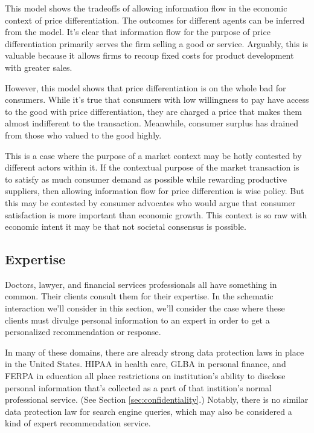 \documentclass[../thesis.tex]{subfiles}
\begin{document}
This model shows the tradeoffs of allowing information
flow in the economic context of price differentiation.
The outcomes for different agents can be inferred from
the model.
It's clear that information flow for the purpose of
price differentiation primarily serves the firm
selling a good or service.
Arguably, this is valuable because it allows firms
to recoup fixed costs for product development with
greater sales.

However, this model shows that price differentiation
is on the whole bad for consumers.
While it's true that consumers with low willingness
to pay have access to the good with price differentiation,
they are charged a price that makes them almost
indifferent to the transaction.
Meanwhile, consumer surplus has drained from those
who valued to the good highly.

This is a case where the purpose of a market context
may be hotly contested by different actors within it.
If the contextual purpose of the market
transaction is to satisfy as much consumer demand as
possible while rewarding productive suppliers,
then allowing information flow for price differention
is wise policy.
But this may be contested by consumer advocates who
would argue that consumer satisfaction is more important
than economic growth.
This context is so raw with economic intent it may be
that not societal consensus is possible.

\subsection{Expertise}
\label{sec:expertise}

Doctors, lawyer, and financial services professionals
all have something in common.
Their clients consult them for their expertise.
In the schematic interaction we'll consider in this
section, we'll consider the case where these clients
must divulge personal information to an expert in
order to get a personalized recommendation or response.

In many of these domains, there are already strong data
protection laws in place in the United States. 
HIPAA in health care,
GLBA in personal finance, and FERPA in education all
place restrictions on institution's ability to disclose personal
information that's collected as a part of that instition's
normal professional service. (See Section \ref{sec:confidentiality}.)
Notably, there is no similar data protection law for search
engine queries, which may also be considered a kind of expert
recommendation service.
\end{document}
